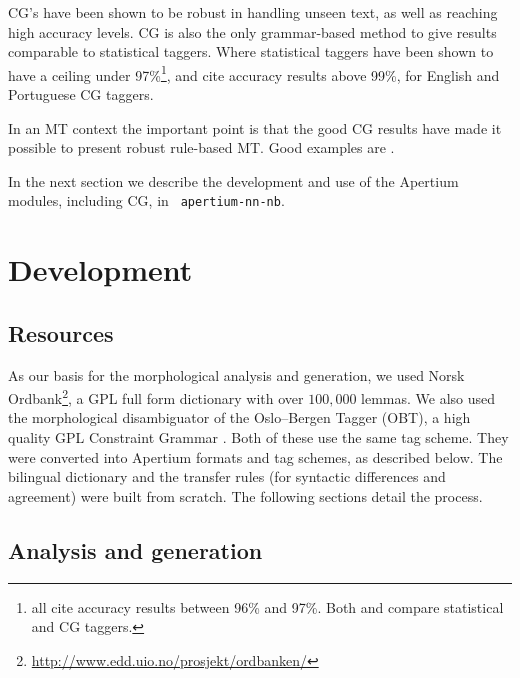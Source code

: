 \documentclass[11pt]{article}
\newcommand{\comment}[1]{\textbf{SKRIV} {\it #1}}
\renewcommand{\comment}[1]{}
\begin{document}
\comment{changed ``parse'' to ``tag'', although most CG's use some
  ``parsing'' to improve ``tagging''...}

CG's have been shown to be robust in handling unseen text, as well as
reaching high accuracy levels. CG is also the only grammar-based
method to give results comparable to statistical taggers. Where
statistical taggers have been shown to have a ceiling under
97\%\footnote{\citet{leech1994claws, brants2000tnt, brill1997uld} all
  cite accuracy results between 96\% and 97\%. Both
  \citet{chanod1995tfc} and \citet{samuelsson1997cls} compare
  statistical and CG taggers.},
\citet{voutilainen1994engcg} and \citet{bick2000palavras} cite
accuracy results above 99\%, for English and Portuguese CG taggers. 

In an MT context the important point is that the good CG results have 
made it possible to present robust rule-based MT. Good examples are
\citet{bick2007fmw}. %

In the next section we describe the development and use of the
Apertium modules, including CG, in {\tt \small 
  apertium-nn-nb}.

\section{Development}

  \label{sec:development}
\subsection{Resources}

As our basis for the morphological analysis and generation, we used
Norsk
Ordbank\footnote{\href{http://www.edd.uio.no/prosjekt/ordbanken/}{http://www.edd.uio.no/prosjekt/ordbanken/}
}, a GPL full form dictionary with over $100,000$ lemmas. We also used
the morphological disambiguator of the Oslo–Bergen Tagger (OBT), a
high quality GPL Constraint Grammar \citep{hagen2000cbt}. Both of
these use the same tag scheme. They were converted into Apertium
formats and tag schemes, as described below. The bilingual dictionary and
the transfer rules (for syntactic differences and agreement) were built from 
scratch. The following sections detail the process.

\subsection{Analysis and generation}
\end{document}
